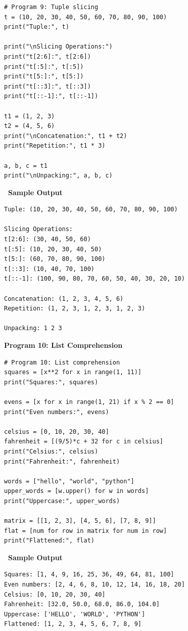 \documentclass[12pt,a4paper]{article}
\newcommand{\outhead}{\noindent\colorbox{cmrgreen!25}%
  {\textbf{\small\color{cmrdark}~Sample Output~}}\par\vspace{-1pt}}
\begin{document}
\begin{lstlisting}
# Program 9: Tuple slicing
t = (10, 20, 30, 40, 50, 60, 70, 80, 90, 100)
print("Tuple:", t)

print("\nSlicing Operations:")
print("t[2:6]:", t[2:6])
print("t[:5]:", t[:5])
print("t[5:]:", t[5:])
print("t[::3]:", t[::3])
print("t[::-1]:", t[::-1])

t1 = (1, 2, 3)
t2 = (4, 5, 6)
print("\nConcatenation:", t1 + t2)
print("Repetition:", t1 * 3)

a, b, c = t1
print("\nUnpacking:", a, b, c)
\end{lstlisting}

\outhead
\begin{lstlisting}[style=outputstyle]
Tuple: (10, 20, 30, 40, 50, 60, 70, 80, 90, 100)

Slicing Operations:
t[2:6]: (30, 40, 50, 60)
t[:5]: (10, 20, 30, 40, 50)
t[5:]: (60, 70, 80, 90, 100)
t[::3]: (10, 40, 70, 100)
t[::-1]: (100, 90, 80, 70, 60, 50, 40, 30, 20, 10)

Concatenation: (1, 2, 3, 4, 5, 6)
Repetition: (1, 2, 3, 1, 2, 3, 1, 2, 3)

Unpacking: 1 2 3
\end{lstlisting}

\vspace{0.5cm}

\textbf{Program 10: List Comprehension}

\begin{lstlisting}
# Program 10: List comprehension
squares = [x**2 for x in range(1, 11)]
print("Squares:", squares)

evens = [x for x in range(1, 21) if x % 2 == 0]
print("Even numbers:", evens)

celsius = [0, 10, 20, 30, 40]
fahrenheit = [(9/5)*c + 32 for c in celsius]
print("Celsius:", celsius)
print("Fahrenheit:", fahrenheit)

words = ["hello", "world", "python"]
upper_words = [w.upper() for w in words]
print("Uppercase:", upper_words)

matrix = [[1, 2, 3], [4, 5, 6], [7, 8, 9]]
flat = [num for row in matrix for num in row]
print("Flattened:", flat)
\end{lstlisting}

\outhead
\begin{lstlisting}[style=outputstyle]
Squares: [1, 4, 9, 16, 25, 36, 49, 64, 81, 100]
Even numbers: [2, 4, 6, 8, 10, 12, 14, 16, 18, 20]
Celsius: [0, 10, 20, 30, 40]
Fahrenheit: [32.0, 50.0, 68.0, 86.0, 104.0]
Uppercase: ['HELLO', 'WORLD', 'PYTHON']
Flattened: [1, 2, 3, 4, 5, 6, 7, 8, 9]
\end{lstlisting}
\end{document}
